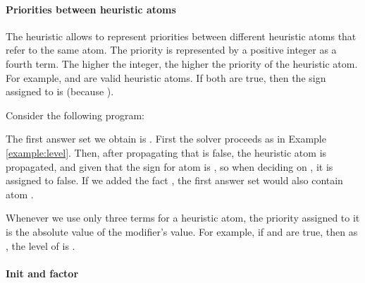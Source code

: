 \paragraph{Priorities between heuristic atoms}

The  heuristic allows to represent priorities between different heuristic atoms that refer to the same atom.
The priority is represented by a positive integer as a fourth term.
The higher the integer, the higher the priority of the heuristic atom.
For example,  and  are valid heuristic atoms.
If both are true, then the sign assigned to  is  (because ).  

\begin{example}
\label{example:priority}
Consider the following program:

The first answer set we obtain is 
.
First the solver proceeds as in Example \ref{example:level}. 
Then, after propagating that  is false, 
the heuristic atom  is propagated,
and given that  the sign for atom  is , 
so when deciding on , it is assigned to false.
If we added the fact , 
the first answer set would also contain atom .
\eexample
\end{example}

\begin{note}
Whenever we use only three terms for a heuristic atom, 
the priority assigned to it is the absolute value of the modifier's value.
For example, if  and  are true,
then as , the level of  is .
\end{note}

\paragraph{Init and factor}

